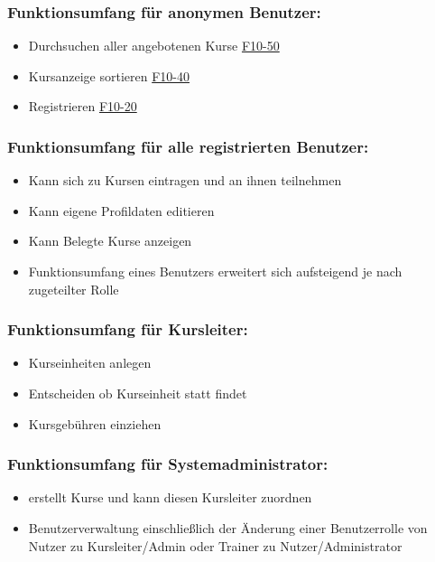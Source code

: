 \documentclass[a4paper]{scrreprt}
\begin{document}
     	\subsubsection{Funktionsumfang für anonymen Benutzer:}
       		\begin{itemize}
	      		\item Durchsuchen aller angebotenen Kurse \hyperlink{kursSuche}{F10-50}
	      		\item Kursanzeige sortieren \hyperlink{kursAnzSort}{F10-40}
	       		\item Registrieren \hyperlink{Registrieren}{F10-20}
       		\end{itemize}
     	\subsubsection{Funktionsumfang für alle registrierten Benutzer:}
			\begin{itemize}
				\item Kann sich zu Kursen eintragen und an ihnen teilnehmen
				\item Kann eigene Profildaten editieren
				\item Kann Belegte Kurse anzeigen
				\item Funktionsumfang eines Benutzers erweitert sich aufsteigend je nach zugeteilter Rolle
			\end{itemize}
		\subsubsection{Funktionsumfang für Kursleiter:}
			\begin{itemize}
				\item Kurseinheiten anlegen
				\item Entscheiden ob Kurseinheit statt findet
				\item Kursgebühren einziehen
			\end{itemize}
		\subsubsection{Funktionsumfang für Systemadministrator:}
			\begin{itemize}
				\item erstellt Kurse und kann diesen Kursleiter zuordnen
				\item Benutzerverwaltung einschließlich der Änderung einer Benutzerrolle von Nutzer zu Kursleiter/\gls{Admin} oder \gls{Trainer} zu Nutzer/Administrator
			\end{itemize}
			
\end{document}
